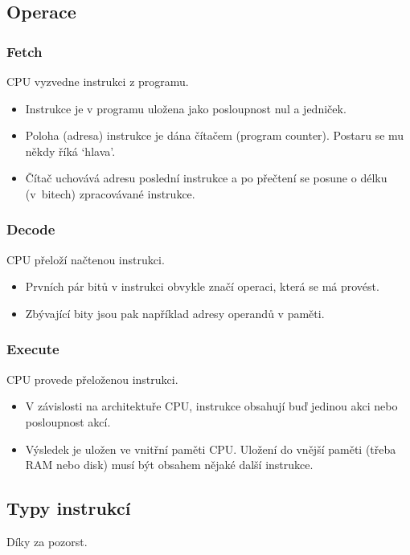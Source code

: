 \documentclass[aspectratio=169,11pt]{beamer}
\begin{document}
\subsection[Operace]{Operace}

\begin{frame}
 \frametitle{Fetch}
 \begin{tcolorbox}[title=Fetch,center,width=.95\textwidth]
  CPU \alert{vyzvedne} instrukci z programu.
 \end{tcolorbox}
 \begin{itemize}
  \item Instrukce je v programu uložena jako posloupnost nul a jedniček.
  \item Poloha (adresa) instrukce je dána čítačem (program counter). Postaru se
   mu někdy říká `hlava'.
  \item Čítač uchovává adresu poslední instrukce a po přečtení se posune o délku
   (v~bitech) zpracovávané instrukce.
 \end{itemize}
\end{frame}

\begin{frame}
 \frametitle{Decode}
 \begin{tcolorbox}[title=Decode,center,width=.95\textwidth]
  CPU \alert{přeloží} načtenou instrukci.
 \end{tcolorbox}
 \begin{itemize}
  \item Prvních pár bitů v instrukci obvykle značí operaci, která se má provést.
  \item Zbývající bity jsou pak například adresy operandů v paměti.
 \end{itemize}
\end{frame}

\begin{frame}
 \frametitle{Execute}
 \begin{tcolorbox}[title=Execute,center,width=.95\textwidth]
  CPU \alert{provede} přeloženou instrukci.
 \end{tcolorbox}
 \begin{itemize}
  \item V závislosti na architektuře CPU, instrukce obsahují buď jedinou akci
   nebo posloupnost akcí.
  \item Výsledek je uložen ve vnitřní paměti CPU. Uložení do vnější paměti
   (třeba RAM nebo disk) musí být obsahem nějaké další instrukce.
 \end{itemize}
\end{frame}

\subsection[Instrukce]{Typy instrukcí}

\begin{frame}
 \centering\Huge Díky za pozorst.
\end{frame}
\end{document}
